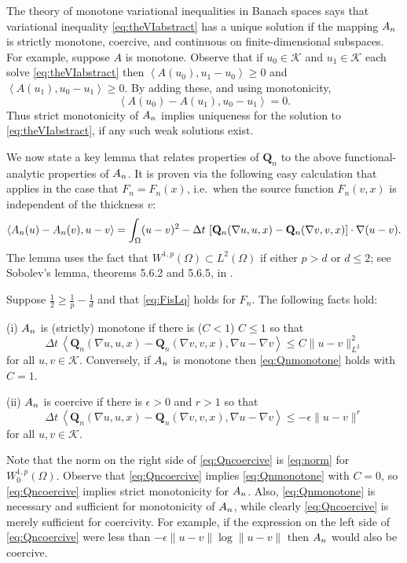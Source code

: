 \documentclass[final,leqno,onefignum,onetabnum]{siamltex1213bueler}
\newcommand\bQ{\mathbf{Q}}
\newcommand\eps{\epsilon}
\renewcommand{\grad}{\nabla}
\newcommand{\ip}[2]{\ensuremath{\left<#1,#2\right>}}
\begin{document}
The theory of monotone variational inequalities in Banach spaces \cite[chapter III]{KinderlehrerStampacchia} says that variational inequality \eqref{eq:theVIabstract} has a unique solution if the mapping $A_{n}$ is strictly monotone, coercive, and continuous on finite-dimensional subspaces.  For example, suppose $A$ is monotone.  Observe that if $u_0 \in \mathcal{K}$ and $u_1 \in \mathcal{K}$ each solve \eqref{eq:theVIabstract} then $\ip{A(u_0)}{u_1-u_0} \ge 0$ and $\ip{A(u_1)}{u_0-u_1} \ge 0$.  By adding these, and using monotonicity,
    $$\ip{A(u_0) - A(u_1)}{u_0 - u_1} = 0.$$
Thus strict monotonicity of $A_{n}$ implies uniqueness for the solution to \eqref{eq:theVIabstract}, if any such weak solutions exist.

We now state a key lemma that relates properties of $\bQ_n$ to the above functional-analytic properties of $A_{n}$.  It is proven via the following easy calculation that applies in the case that $F_n=F_n(x)$, i.e.~when the source function $F_n(v,x)$ is independent of the thickness $v$:
   $$\ip{\An(u) - \An(v)}{u-v} = \int_\Omega (u-v)^2 - \Delta t\, \left[\bQ_n(\grad u,u,x) - \bQ_n(\grad v,v,x)\right] \cdot \grad(u-v).$$
The lemma uses the fact that $W^{1,p}(\Omega) \subset L^2(\Omega)$ if either $p>d$ or $d\le 2$; see Sobolev's lemma, theorems 5.6.2 and 5.6.5, in \cite{Evans}.

\begin{lemma}  \label{lem:monotonecoercive}  Suppose $\frac{1}{2} \ge \frac{1}{p} - \frac{1}{d}$ and that \eqref{eq:FisLq} holds for $F_n$.  The following facts hold:

(i)  $A_{n}$ is (strictly) monotone if there is ($C<1$) $C\le 1$ so that
\begin{equation}
\Delta t\,\ip{\bQ_n(\grad u,u,x) - \bQ_n(\grad v,v,x)}{\grad u - \grad v} \le C \|u-v\|_{L^2}^2 \label{eq:Qnmonotone}
\end{equation}
for all $u,v \in \mathcal{K}$.  Conversely, if $A_{n}$ is monotone then \eqref{eq:Qnmonotone} holds with $C=1$.

(ii)  $A_{n}$ is coercive if there is $\eps>0$ and $r>1$ so that
\begin{equation}
\Delta t\,\ip{\bQ_n(\grad u,u,x) - \bQ_n(\grad v,v,x)}{\grad u - \grad v} \le -\eps \|u-v\|^r \label{eq:Qncoercive}
\end{equation}
for all $u,v \in \mathcal{K}$.
\end{lemma}

Note that the norm on the right side of \eqref{eq:Qncoercive} is \eqref{eq:norm} for $W_0^{1,p}(\Omega)$.  Observe that \eqref{eq:Qncoercive} implies \eqref{eq:Qnmonotone} with $C=0$, so \eqref{eq:Qncoercive} implies strict monotonicity for $A_{n}$.  Also, \eqref{eq:Qnmonotone} is necessary and sufficient for monotonicity of $A_{n}$, while clearly \eqref{eq:Qncoercive} is merely sufficient for coercivity.  For example, if the expression on the left side of \eqref{eq:Qncoercive} were less than $-\eps \|u-v\| \log \|u-v\|$ then $A_{n}$ would also be coercive.
\end{document}
